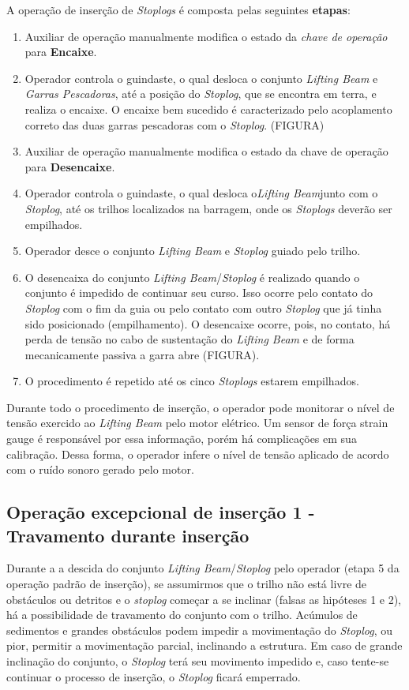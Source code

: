 A operação de inserção de \emph{Stoplogs} é composta pelas seguintes
\textbf{etapas}:
\begin{enumerate}
\item Auxiliar de operação manualmente modifica o estado da \emph{chave de operação} para \textbf{Encaixe}.
\item Operador controla o guindaste, o qual desloca o conjunto \emph{Lifting Beam} e \emph{Garras Pescadoras}, até a posição do \emph{Stoplog}, que se encontra em terra, e realiza o encaixe. O encaixe bem sucedido é caracterizado pelo acoplamento correto das duas garras pescadoras com o \emph{Stoplog}. (FIGURA)
\item Auxiliar de operação manualmente modifica o estado da chave de operação para \textbf{Desencaixe}.
\item Operador controla o guindaste, o qual desloca o\emph{Lifting Beam}junto com o \emph{Stoplog}, até os trilhos localizados na barragem, onde os \emph{Stoplogs} deverão ser empilhados.
\item Operador desce o conjunto \emph{Lifting Beam} e \emph{Stoplog} guiado pelo trilho.
\item O desencaixa do conjunto \emph{Lifting Beam}/\emph{Stoplog} é realizado quando o conjunto é impedido de continuar seu curso. Isso ocorre pelo contato do \emph{Stoplog} com o fim da guia ou pelo contato com outro \emph{Stoplog} que já tinha sido posicionado (empilhamento). O desencaixe ocorre, pois, no contato, há perda de tensão no cabo de sustentação do \emph{Lifting Beam} e de forma mecanicamente passiva a garra abre (FIGURA).
\item O procedimento é repetido até os cinco \emph{Stoplogs} estarem empilhados.
\end{enumerate}

Durante todo o procedimento de inserção, o operador pode monitorar o nível de
tensão exercido ao \emph{Lifting Beam} pelo motor elétrico. Um sensor de força
strain gauge é responsável por essa informação, porém há complicações em sua
calibração. Dessa forma, o operador infere o nível de tensão aplicado de acordo
com o ruído sonoro gerado pelo motor.

\subsection{Operação excepcional de inserção 1 - Travamento durante inserção}

Durante a a descida do conjunto  \emph{Lifting Beam}/\emph{Stoplog} pelo operador (etapa 5 da operação padrão de inserção), se assumirmos que o trilho não está livre de obstáculos ou detritos e o \emph{stoplog} começar a se inclinar (falsas as
hipóteses 1 e 2), há a possibilidade de travamento do conjunto com o trilho. Acúmulos de sedimentos e grandes obstáculos
podem impedir a movimentação do \emph{Stoplog}, ou pior, permitir a movimentação
parcial, inclinando a estrutura. Em caso de grande inclinação do conjunto, o
\emph{Stoplog} terá seu movimento impedido e, caso tente-se continuar o processo
de inserção, o \emph{Stoplog} ficará emperrado.

